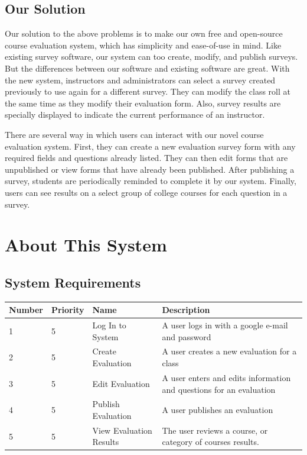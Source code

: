 \documentclass{article}
\begin{document}
\subsection{Our Solution}

Our solution to the above problems is to make our own free and open-source course evaluation system, which has simplicity and ease-of-use in mind. Like existing survey software, our system can too create, modify, and publish surveys. But the differences between our software and existing software are great. With the new system, instructors and administrators can select a survey created previously to use again for a different survey. They can modify the class roll at the same time as they modify their evaluation form. Also, survey results are specially displayed to indicate the current performance of an instructor.

There are several way in which users can interact with our novel course evaluation system. First, they can create a new evaluation survey form with any required fields and questions already listed. They can then edit forms that are unpublished or view forms that have already been published. After publishing a survey, students are periodically reminded to complete it by our system. Finally, users can see results on a select group of college courses for each question in a survey.

\section{About This System}

\subsection{System Requirements}

\begin{center}
\begin{tabular}{|p{1.5cm}|p{1.5cm}|p{3.5cm}|p{6cm}|} 
\hline
\textbf{Number} & \textbf{Priority} & \textbf{Name} & \textbf{Description} \\
\hline
1 & 5 & Log In to System & A user logs in with a google e-mail and password \\ 
\hline
2 & 5 & Create Evaluation & A user creates a new evaluation for a class \\ 
\hline
3 & 5 & Edit Evaluation & A user enters and edits information and questions for an evaluation \\  
\hline
4 & 5 & Publish Evaluation & A user publishes an evaluation \\
\hline
5 & 5 & View Evaluation Results & The user reviews a course, or category of courses results. \\ 
\hline

\end{tabular}
\end{center}
\end{document}
